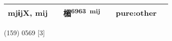 \documentclass[14pt,a4paper]{scrartcl}
\begin{document}
\begin{longtable}[c]{@{}llllll@{}}
\begin{minipage}[t]{0.14\columnwidth}
mjɨjX, mij
\strut\end{minipage} &
\begin{minipage}[t]{0.14\columnwidth}\raggedright\strut
\strut\end{minipage} &
\begin{minipage}[t]{0.14\columnwidth}\raggedright\strut
楣\textsuperscript{6963~mij}
\strut\end{minipage} &
\begin{minipage}[t]{0.14\columnwidth}\raggedright\strut
\strut\end{minipage} &
\begin{minipage}[t]{0.14\columnwidth}\raggedright\strut
pure:other
\strut\end{minipage}\tabularnewline
\bottomrule
\end{longtable}

(159) 0569 {[}3{]}
\end{document}
